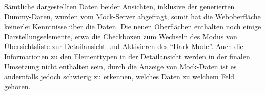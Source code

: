 Sämtliche dargestellten Daten beider Ansichten, inklusive der generierten Dummy-Daten, wurden vom Mock-Server abgefragt, somit hat die Weboberfläche keinerlei Kenntnisse über die Daten. Die neuen Oberflächen enthalten noch einige Darstellungselemente, etwa die Checkboxen zum Wechseln des Modus von Übersichtsliste zur Detailansicht und Aktivieren des \enquote{Dark Mode}. Auch die Informationen zu den Elementtypen in der Detailansicht werden in der finalen Umsetzung nicht enthalten sein, durch die Anzeige von Mock-Daten ist es andernfalls jedoch schwierig zu erkennen, welches Daten zu welchem Feld gehören.
